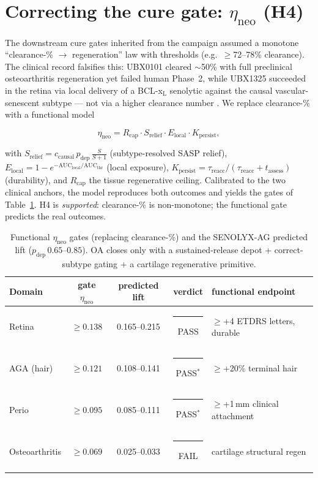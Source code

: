 \documentclass[11pt,a4paper]{article}
\newcommand{\tierdisc}[1]{\textcolor{#1}{\rule[0.05ex]{1.0ex}{1.0ex}}}
\newcommand{\tierGreen}{\tierdisc{green!60!black}}
\newcommand{\tierOrange}{\tierdisc{orange!90!black}}
\newcommand{\tierRed}{\tierdisc{red!80!black}}
\newcommand{\pdep}{p_{\mathrm{dep}}}
\begin{document}
\section{Correcting the cure gate: $\eta_{\mathrm{neo}}$ (H4)}
\label{sec:pd}

The downstream cure gates inherited from the campaign assumed a monotone
``clearance-\% $\to$ regeneration'' law with thresholds (e.g.\ $\ge$72--78\%
clearance). The clinical record falsifies this: UBX0101 cleared $\sim$50\% with
full preclinical osteoarthritis regeneration yet failed human Phase~2, while
UBX1325 succeeded in the retina via local delivery of a BCL-x$_{\mathrm L}$
senolytic against the causal vascular-senescent subtype --- not via a higher
clearance number \citep{jeon2017,ubx1325}. We replace clearance-\% with a
functional model

\begin{equation}
\eta_{\mathrm{neo}} = R_{\mathrm{cap}}\cdot S_{\mathrm{relief}}\cdot
E_{\mathrm{local}}\cdot K_{\mathrm{persist}},
\label{eq:eta}
\end{equation}

with $S_{\mathrm{relief}}=c_{\mathrm{causal}}\,\pdep\,\frac{S}{S+1}$ (subtype-resolved
SASP relief), $E_{\mathrm{local}}=1-e^{-\mathrm{AUC_{local}}/\mathrm{AUC_{thr}}}$
(local exposure), $K_{\mathrm{persist}}=\tau_{\mathrm{reacc}}/(\tau_{\mathrm{reacc}}+t_{\mathrm{assess}})$
(durability), and $R_{\mathrm{cap}}$ the tissue regenerative ceiling. Calibrated
to the two clinical anchors, the model reproduces both outcomes and yields the
gates of Table~\ref{tab:eta}. H4 is \emph{supported}: clearance-\% is non-monotone;
the functional gate predicts the real outcomes.

\begin{table}[h]
\centering
\caption{Functional $\eta_{\mathrm{neo}}$ gates (replacing clearance-\%) and the
SENOLYX-AG predicted lift ($\pdep\,0.65$--$0.85$). OA closes only with a
sustained-release depot + correct-subtype gating + a cartilage regenerative
primitive.}
\label{tab:eta}
\small
\begin{tabular}{@{}lcccl@{}}
\toprule
Domain & gate $\eta_{\mathrm{neo}}$ & predicted lift & verdict & functional endpoint \\
\midrule
Retina & $\ge0.138$ & 0.165--0.215 & \tierGreen{} PASS & $\ge$+4 ETDRS letters, durable \\
AGA (hair) & $\ge0.121$ & 0.108--0.141 & \tierOrange{} PASS$^*$ & $\ge$+20\% terminal hair \\
Perio & $\ge0.095$ & 0.085--0.111 & \tierOrange{} PASS$^*$ & $\ge$+1\,mm clinical attachment \\
Osteoarthritis & $\ge0.069$ & 0.025--0.033 & \tierRed{} FAIL & cartilage structural regen \\
\bottomrule
\end{tabular}
\end{table}
\end{document}
